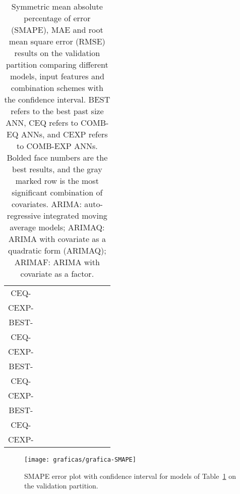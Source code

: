 \documentclass[energies,article,accept,moreauthors,pdftex,12pt,a4paper]{mdpi}
\newcommand{\ann}{ANN\xspace}
\newcommand{\anns}{ANNs\xspace}
\newcommand{\comb}{COMB-EXP\xspace}
\newcommand{\combeq}{COMB-EQ\xspace}
\begin{document}
\begin{table} [H]
\begin{tabular}{cccccccccc}
 CEQ-  &  &  &  &  &  &  &  &  & \\
 CEXP-  &  &  &  &  &  &  &  &  & \\
 \hline
 BEST-  &  &  &  &  &  &  &  &  & \\
 CEQ-  &  &  &  &  &  &  &  &  & \\
 CEXP-  &  &  &  &  &  &  &  &  & \\
 \hline
 BEST-  &  &  &  &  &  &  &  &  & \\
 CEQ-  &  &  &  &  &  &  &  &  & \\
 CEXP-  &  &  &  &  &  &  &  &  & \\
 \hline
 BEST- &  &  &  &  &  &  &  &  & \\
 CEQ- &  &  &  &  &  &  &  &  & \\
 CEXP- &  &  &  &  &  &  &  &  & \\
 \bottomrule 
 \end{tabular}
 \normalsize
 \caption{Symmetric mean absolute percentage of error (SMAPE), MAE and root mean square error (RMSE) results on the validation
 partition comparing different models, input features and combination schemes
 with the  confidence interval. BEST refers to the best past size \ann,
 CEQ refers to \combeq \anns, and CEXP refers to \comb \anns. Bolded face
 numbers are the best results, and the gray marked row is the most significant
 combination of covariates. ARIMA: auto-regressive integrated moving average models; ARIMAQ: ARIMA with covariate  as a quadratic
form (ARIMAQ); ARIMAF: ARIMA with covariate  as a factor.}
\label{tab:valresults}
\end{table}

\begin{figure}[H]
 \centering
 \texttt{[image: graficas/grafica-SMAPE]}\\
 \caption{SMAPE error plot with  confidence interval for models
 of Table~\ref{tab:valresults} on the validation partition.\label{fig:val-smape}}
\end{figure}
\end{document}
